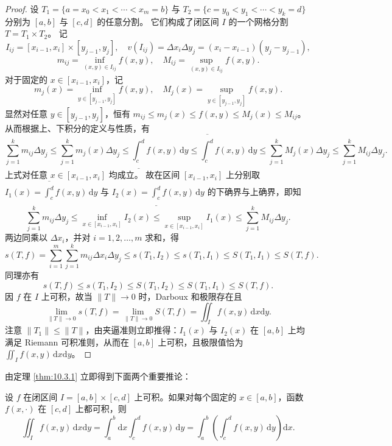 \begin{proof}
设 $T_1 = \{a = x_0 < x_1 < \cdots < x_m = b\}$ 与 $T_2 = \{c = y_0 < y_1 < \cdots < y_k = d\}$ 分别为 $[a, b]$ 与 $[c, d]$ 的任意分割。
它们构成了闭区间 $I$ 的一个网格分割 $T = T_1 \times T_2$。
记
\[
I_{ij} = [x_{i-1}, x_i] \times [y_{j-1}, y_j], \quad v(I_{ij}) = \Delta x_i \Delta y_j = (x_i - x_{i-1})(y_j - y_{j-1}),
\]
\[
m_{ij} = \inf_{(x, y) \in I_{ij}} f(x, y), \quad M_{ij} = \sup_{(x, y) \in I_{ij}} f(x, y).
\]
对于固定的 $x \in [x_{i-1}, x_i]$，记
\[
m_j(x) = \inf_{y \in [y_{j-1}, y_j]} f(x, y), \quad M_j(x) = \sup_{y \in [y_{j-1}, y_j]} f(x, y).
\]
显然对任意 $y \in [y_{j-1}, y_j]$，恒有 $m_{ij} \leqslant m_j(x) \leqslant f(x, y) \leqslant M_j(x) \leqslant M_{ij}$。
从而根据上、下积分的定义与性质，有
\[
\sum_{j=1}^k m_{ij} \Delta y_j \leqslant \sum_{j=1}^k m_j(x) \Delta y_j \leqslant \underline{\int_c^d} f(x, y)\,\mathrm{d}y \leqslant \overline{\int_c^d} f(x, y)\,\mathrm{d}y \leqslant \sum_{j=1}^k M_j(x) \Delta y_j \leqslant \sum_{j=1}^k M_{ij} \Delta y_j.
\]
上式对任意 $x \in [x_{i-1}, x_i]$ 均成立。
故在区间 $[x_{i-1}, x_i]$ 上分别取 $I_1(x) = \overline{\int_c^d} f(x, y)\,\mathrm{d}y$ 与 $I_2(x) = \underline{\int_c^d} f(x, y)\,\mathrm{d}y$ 的下确界与上确界，即知
\[
\sum_{j=1}^k m_{ij} \Delta y_j \leqslant \inf_{x \in [x_{i-1}, x_i]} I_2(x) \leqslant \sup_{x \in [x_{i-1}, x_i]} I_1(x) \leqslant \sum_{j=1}^k M_{ij} \Delta y_j.
\]
两边同乘以 $\Delta x_i$，并对 $i = 1, 2, \dots, m$ 求和，得
\[
s(T, f) = \sum_{i=1}^m \sum_{j=1}^k m_{ij} \Delta x_i \Delta y_j \leqslant s(T_1, I_2) \leqslant s(T_1, I_1) \leqslant S(T_1, I_1) \leqslant S(T, f).
\]
同理亦有
\[
s(T, f) \leqslant s(T_1, I_2) \leqslant S(T_1, I_2) \leqslant S(T_1, I_1) \leqslant S(T, f).
\]
因 $f$ 在 $I$ 上可积，故当 $\|T\| \to 0$ 时，Darboux 和极限存在且
\[
\lim_{\|T\| \to 0} s(T, f) = \lim_{\|T\| \to 0} S(T, f) = \iint_I f(x, y)\,\mathrm{d}x\mathrm{d}y.
\]
注意 $\|T_1\| \leqslant \|T\|$，由夹逼准则立即推得：$I_1(x)$ 与 $I_2(x)$ 在 $[a, b]$ 上均满足 Riemann 可积准则，从而在 $[a, b]$ 上可积，且极限值恰为 $\iint_I f(x, y)\,\mathrm{d}x\mathrm{d}y$。
\end{proof}

由定理 \ref{thm:10.3.1} 立即得到下面两个重要推论：

\begin{theorem}[闭区间上化二重积分为累次积分]\label{thm:10.3.2}
设 $f$ 在闭区间 $I = [a, b] \times [c, d]$ 上可积。如果对每个固定的 $x \in [a, b]$，函数 $f(x, \cdot)$ 在 $[c, d]$ 上都可积，则
\[
\iint_I f(x, y)\,\mathrm{d}x\mathrm{d}y = \int_a^b \mathrm{d}x \int_c^d f(x, y)\,\mathrm{d}y = \int_a^b \left( \int_c^d f(x, y)\,\mathrm{d}y \right) \mathrm{d}x.
\]
\end{theorem}

